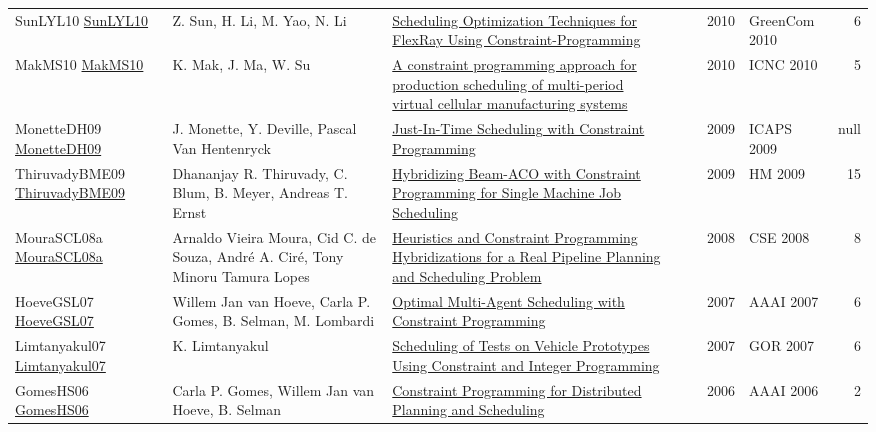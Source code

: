 {\begin{longtable}{p{3cm}p{6cm}p{7cm}rrrp{3cm}r}
SunLYL10 \href{https://doi.org/10.1109/GreenCom-CPSCom.2010.111}{SunLYL10} & Z. Sun, H. Li, M. Yao, N. Li & \href{papers/SunLYL10.pdf}{Scheduling Optimization Techniques for FlexRay Using Constraint-Programming} &  & \cite{SunLYL10} & 2010 & GreenCom 2010 & 6\\
MakMS10 \href{https://doi.org/10.1109/ICNC.2010.5583494}{MakMS10} & K. Mak, J. Ma, W. Su & \href{papers/MakMS10.pdf}{A constraint programming approach for production scheduling of multi-period virtual cellular manufacturing systems} &  & \cite{MakMS10} & 2010 & ICNC 2010 & 5\\
MonetteDH09 \href{http://aaai.org/ocs/index.php/ICAPS/ICAPS09/paper/view/712}{MonetteDH09} & J. Monette, Y. Deville, Pascal Van Hentenryck & \href{papers/MonetteDH09.pdf}{Just-In-Time Scheduling with Constraint Programming} &  & \cite{MonetteDH09} & 2009 & ICAPS 2009 & null\\
ThiruvadyBME09 \href{https://doi.org/10.1007/978-3-642-04918-7\_3}{ThiruvadyBME09} & Dhananjay R. Thiruvady, C. Blum, B. Meyer, Andreas T. Ernst & \href{papers/ThiruvadyBME09.pdf}{Hybridizing Beam-ACO with Constraint Programming for Single Machine Job Scheduling} &  & \cite{ThiruvadyBME09} & 2009 & HM 2009 & 15\\
MouraSCL08a \href{https://doi.org/10.1109/CSE.2008.24}{MouraSCL08a} & Arnaldo Vieira Moura, Cid C. de Souza, Andr{\'{e}} A. Cir{\'{e}}, Tony Minoru Tamura Lopes & \href{papers/MouraSCL08a.pdf}{Heuristics and Constraint Programming Hybridizations for a Real Pipeline Planning and Scheduling Problem} &  & \cite{MouraSCL08a} & 2008 & CSE 2008 & 8\\
HoeveGSL07 \href{http://www.aaai.org/Library/AAAI/2007/aaai07-291.php}{HoeveGSL07} & Willem Jan van Hoeve, Carla P. Gomes, B. Selman, M. Lombardi & \href{papers/HoeveGSL07.pdf}{Optimal Multi-Agent Scheduling with Constraint Programming} &  & \cite{HoeveGSL07} & 2007 & AAAI 2007 & 6\\
Limtanyakul07 \href{https://doi.org/10.1007/978-3-540-77903-2\_65}{Limtanyakul07} & K. Limtanyakul & \href{papers/Limtanyakul07.pdf}{Scheduling of Tests on Vehicle Prototypes Using Constraint and Integer Programming} &  & \cite{Limtanyakul07} & 2007 & GOR 2007 & 6\\
GomesHS06 \href{http://www.aaai.org/Library/Symposia/Spring/2006/ss06-04-024.php}{GomesHS06} & Carla P. Gomes, Willem Jan van Hoeve, B. Selman & \href{papers/GomesHS06.pdf}{Constraint Programming for Distributed Planning and Scheduling} &  & \cite{GomesHS06} & 2006 & AAAI 2006 & 2\\

\end{longtable}}
